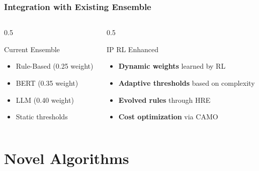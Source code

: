 \documentclass{beamer}
\begin{document}
\begin{frame}
\frametitle{Integration with Existing Ensemble}
\begin{columns}
\begin{column}{0.5\textwidth}
\begin{block}{Current Ensemble}
\begin{itemize}
\item Rule-Based (0.25 weight)
\item BERT (0.35 weight)
\item LLM (0.40 weight)
\item Static thresholds
\end{itemize}
\end{block}
\end{column}
\begin{column}{0.5\textwidth}
\begin{block}{IP RL Enhanced}
\begin{itemize}
\item \textbf{Dynamic weights} learned by RL
\item \textbf{Adaptive thresholds} based on complexity
\item \textbf{Evolved rules} through HRE
\item \textbf{Cost optimization} via CAMO
\end{itemize}
\end{block}
\end{column}
\end{columns}
\end{frame}

\section{Novel Algorithms}
\end{document}
